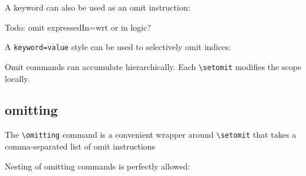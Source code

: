 \documentclass[10pt,a4paper]{article}
\begin{document}
A keyword can also be used as an omit instruction:
\begin{SideBySideExample}[xrightmargin=1cm,frame=single]
  \AngularImpulse[object=1,wrt=0]
  \begingroup
    \AngularImpulse[object=1,wrt=0]
    \AngularImpulse[object=1,wrt=0]
  \endgroup
  \AngularImpulse[object=1,wrt=0]
\end{SideBySideExample}


Todo: omit expressedIn=wrt or in logic?

A \verb+keyword=value+ style can be used to selectively omit indices:
\begin{SideBySideExample}[xrightmargin=1cm,frame=single]
  {
    \AngularImpulse[object=1,wrt=0]
    \AngularImpulse[object=2,wrt=1]
  }
\end{SideBySideExample}

Omit commands can accumulate hierarchically. Each \verb=\setomit= modifies the scope locally.
\begin{SideBySideExample}[xrightmargin=1cm,frame=single]
\end{SideBySideExample}


\subsection{omitting}

The \verb+\omitting+ command is a convenient wrapper around \verb+\setomit+ that takes a comma-separated list of omit instructions

\begin{SideBySideExample}[xrightmargin=1cm,frame=single]
  \AngularImpulse[object=1,wrt=0,around=2]
\end{SideBySideExample}

Nesting of omitting commands is perfectly allowed:
\begin{SideBySideExample}[xrightmargin=1cm,frame=single]
  \AngularImpulse[object=1,wrt=0,around=2]
\end{SideBySideExample}
\end{document}
